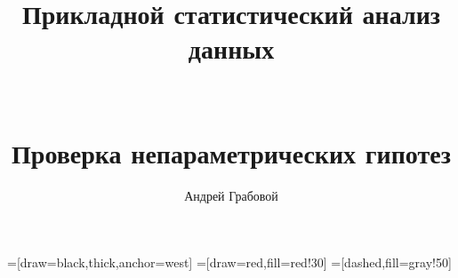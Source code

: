 \documentclass[9pt,pdf,utf8,hyperref={unicode},aspectratio=169]{beamer}
\title[Непараметрические гипотезы]{Прикладной статистический анализ данных\\~\\~\\\small{Проверка непараметрических гипотез}}
\author{Андрей Грабовой}
\date{}
\begin{document}
=[draw=black,thick,anchor=west]
=[draw=red,fill=red!30]
=[dashed,fill=gray!50]

\begin{frame}
 \titlepage
\end{frame}

\section{}

\end{document}
